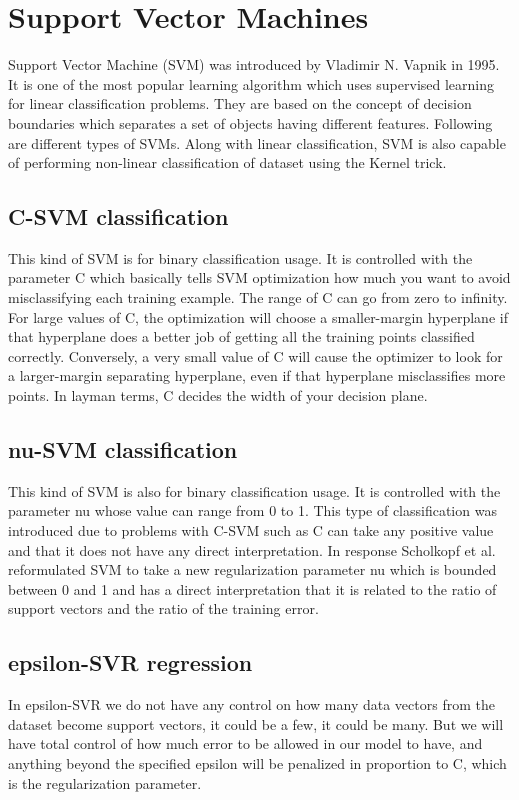 \documentclass[sigconf]{acmart}
\begin{document}
\section{Support Vector Machines}

Support Vector Machine (SVM) was introduced by Vladimir N. Vapnik in 1995. It is one of the most popular learning algorithm which uses supervised learning for linear classification problems. They are based on the concept of decision boundaries which separates a set of objects having different features. Following are different types of SVMs. Along with linear classification, SVM is also capable of performing non-linear classification of dataset using the Kernel trick. 
\subsection{C-SVM classification}
This kind of SVM is for binary classification usage. It is controlled with the parameter C which basically tells SVM optimization how much you want to avoid misclassifying each training example. The range of C can go from zero to infinity. For large values of C, the optimization will choose a smaller-margin hyperplane if that hyperplane does a better job of getting all the training points classified correctly. Conversely, a very small value of C will cause the optimizer to look for a larger-margin separating hyperplane, even if that hyperplane misclassifies more points. In layman terms, C decides the width of your decision plane.

\subsection{nu-SVM classification}
This kind of SVM is also for binary classification usage. It is controlled with the parameter nu whose value can range from 0 to 1. This type of classification was introduced due to problems with C-SVM such as C can take any positive value and that it does not have any direct interpretation. In response Scholkopf et al. reformulated SVM to take a new regularization parameter nu which is bounded between 0 and 1 and has a direct interpretation that it is related to the ratio of support vectors and the ratio of the training error.

  
\subsection{epsilon-SVR regression}
In epsilon-SVR we do not have any control on how many data vectors from the dataset become support vectors, it could be a few, it could be many. But we will have total control of how much error to be allowed in our model to have, and anything beyond the specified epsilon will be penalized in proportion to C, which is the regularization parameter.
\end{document}

